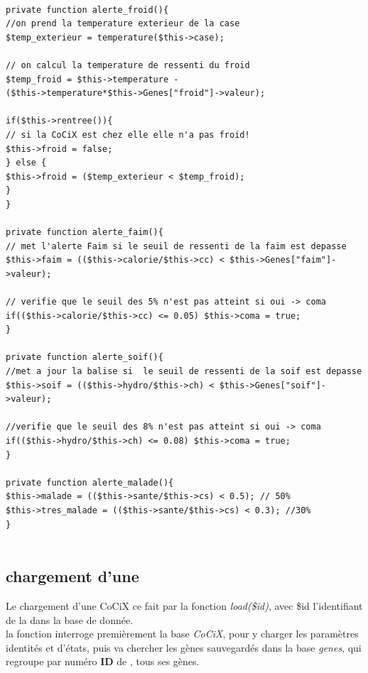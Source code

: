 \documentclass[french]{report}
\newlength{\du}\fi
\begin{document}
\begin{lstlisting}[caption={Fonctions d'alertes}]

private function alerte_froid(){
//on prend la temperature exterieur de la case
$temp_exterieur = temperature($this->case);

// on calcul la temperature de ressenti du froid
$temp_froid = $this->temperature - 
($this->temperature*$this->Genes["froid"]->valeur);

if($this->rentree()){
// si la CoCiX est chez elle elle n'a pas froid!
$this->froid = false;
} else {
$this->froid = ($temp_exterieur < $temp_froid);
}
}

private function alerte_faim(){
// met l'alerte Faim si le seuil de ressenti de la faim est depasse
$this->faim = (($this->calorie/$this->cc) < $this->Genes["faim"]->valeur);

// verifie que le seuil des 5% n'est pas atteint si oui -> coma
if(($this->calorie/$this->cc) <= 0.05) $this->coma = true;
}

private function alerte_soif(){
//met a jour la balise si  le seuil de ressenti de la soif est depasse
$this->soif = (($this->hydro/$this->ch) < $this->Genes["soif"]->valeur);

//verifie que le seuil des 8% n'est pas atteint si oui -> coma
if(($this->hydro/$this->ch) <= 0.08) $this->coma = true;
}

private function alerte_malade(){
$this->malade = (($this->sante/$this->cs) < 0.5); // 50%
$this->tres_malade = (($this->sante/$this->cs) < 0.3); //30%	
}


\end{lstlisting}
\subsection{chargement d'une \CoCiX}
Le chargement d'une CoCiX ce fait par la fonction \textit{load(\$id)}, avec \$id l'identifiant de la \CoCiX dans la base de donnée.\\
la fonction interroge premièrement la base \textit{CoCiX}, pour y charger les paramètres identités et d'états, puis va chercher les gènes sauvegardés dans la base \textit{genes}, qui regroupe par numéro \textbf{ID} de \CoCiX, tous ses gènes.\\
\end{document}
